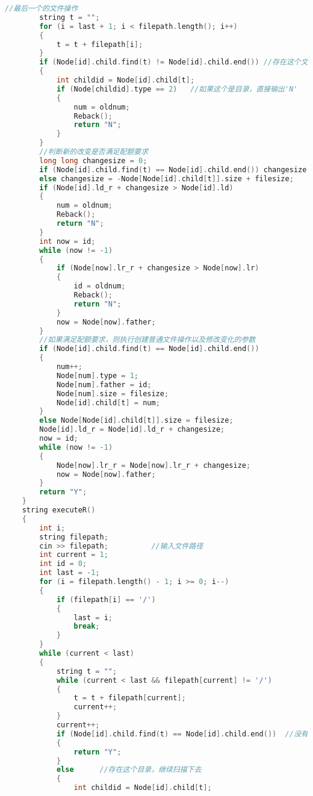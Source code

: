 \begin{lstlisting}[language=C++]
        //最后一个的文件操作
        string t = "";
        for (i = last + 1; i < filepath.length(); i++)
        {
            t = t + filepath[i];
        }
        if (Node[id].child.find(t) != Node[id].child.end()) //存在这个文件
        {
            int childid = Node[id].child[t];
            if (Node[childid].type == 2)   //如果这个是目录，直接输出'N'
            {
                num = oldnum;
                Reback();
                return "N";
            }
        }
        //判断新的改变是否满足配额要求
        long long changesize = 0;
        if (Node[id].child.find(t) == Node[id].child.end()) changesize = filesize;
        else changesize = -Node[Node[id].child[t]].size + filesize;
        if (Node[id].ld_r + changesize > Node[id].ld)
        {
            num = oldnum;
            Reback();
            return "N";
        }
        int now = id;
        while (now != -1)
        {
            if (Node[now].lr_r + changesize > Node[now].lr)
            {
                id = oldnum;
                Reback();
                return "N";
            }
            now = Node[now].father;
        }
        //如果满足配额要求，则执行创建普通文件操作以及修改变化的参数
        if (Node[id].child.find(t) == Node[id].child.end())
        {
            num++;
            Node[num].type = 1;
            Node[num].father = id;
            Node[num].size = filesize;
            Node[id].child[t] = num;
        }
        else Node[Node[id].child[t]].size = filesize;
        Node[id].ld_r = Node[id].ld_r + changesize;
        now = id;
        while (now != -1)
        {
            Node[now].lr_r = Node[now].lr_r + changesize;
            now = Node[now].father;
        }
        return "Y";
    }
    string executeR()
    {
        int i;
        string filepath;
        cin >> filepath;          //输入文件路径
        int current = 1;
        int id = 0;
        int last = -1;
        for (i = filepath.length() - 1; i >= 0; i--)
        {
            if (filepath[i] == '/')
            {
                last = i;
                break;
            }
        }
        while (current < last)
        {
            string t = "";
            while (current < last && filepath[current] != '/')
            {
                t = t + filepath[current];
                current++;
            }
            current++;
            if (Node[id].child.find(t) == Node[id].child.end())  //没有这个目录，直接按照删除成功处理
            {
                return "Y";
            }
            else      //存在这个目录，继续扫描下去
            {
                int childid = Node[id].child[t];

\end{lstlisting}
